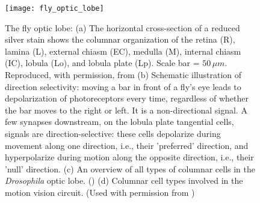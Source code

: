 
\begin{figure}
\centering
\hspace*{-1cm} 
\texttt{[image: fly\_optic\_lobe]}
\caption[The fly optic lobe] {The fly optic lobe: (a) The horizontal cross-section of a reduced silver stain shows the columnar organization of the retina (R), lamina (L), external chiasm (EC), medulla (M), internal chiasm (IC), lobula (Lo), and lobula plate (Lp). Scale bar = $50 \, \mu m$. Reproduced, with permission, from \cite{Takemura2008} (b) Schematic illustration of direction selectivity: moving a bar in front of a fly's eye leads to depolarization of photoreceptors every time, regardless of whether the bar moves to the right or left. It is a non-directional signal. A few synapses downstream, on the lobula plate tangential cells, signals are direction-selective: these cells depolarize during movement along one direction, i.e., their 'preferred' direction, and hyperpolarize during motion along the opposite direction, i.e., their 'null' direction. (c) An overview of all types of columnar cells in the \textit{Drosophila} optic lobe. (\cite{Fischbach1989}) (d) Columnar cell types involved in the motion vision circuit. (Used with permission from \cite{Borst2020, Borst2020b})}
\label{fig:opticlobe}
\end{figure}

